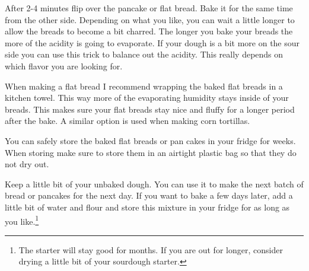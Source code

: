 After 2-4 minutes flip over the pancake or flat bread. Bake it for the same
time from the other side. Depending on what you like, you can wait a little
longer to allow the breads to become a bit charred.  The longer you
bake your breads the more of the acidity is going to evaporate. If your
dough is a bit more on the sour side you can use this trick to balance
out the acidity. This really depends on which flavor you are looking for.

When making a flat bread I recommend wrapping the baked flat breads
in a kitchen towel. This way more of the evaporating humidity
stays inside of your breads. This makes sure your flat breads stay
nice and fluffy for a longer period after the bake. A similar option is
used when making corn tortillas.

You can safely store the baked flat breads or pan cakes in your fridge
for weeks. When storing make sure to store them in an airtight plastic bag so that
they do not dry out.

Keep a little bit of your unbaked dough. You can use it to make the next
batch of bread or pancakes for the next day. If you want to bake a few days later, add
a little bit of water and flour and store this mixture in your fridge
for as long as you like.\footnote{The starter will stay good for months. If you are out
for longer, consider drying a little bit of your sourdough starter.}
